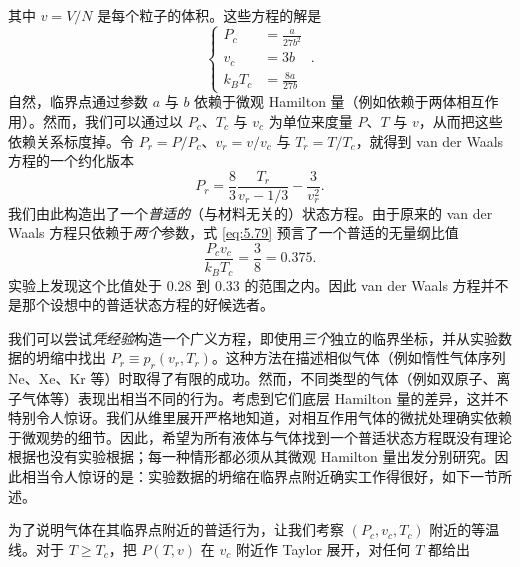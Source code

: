 其中 $v=V/N$ 是每个粒子的体积。这些方程的解是
\begin{equation}\label{eq:5.79}
\left\{
\begin{aligned}
P_c&=\frac{a}{27b^2}\\
v_c&=3b\\
k_BT_c&=\frac{8a}{27b}
\end{aligned}
\right.\ .
\end{equation}
自然，临界点通过参数 $a$ 与 $b$ 依赖于微观 Hamilton 量（例如依赖于两体相互作用）。然而，我们可以通过以 $P_c$、$T_c$ 与 $v_c$ 为单位来度量 $P$、$T$ 与 $v$，从而把这些依赖关系标度掉。令 $P_r=P/P_c$、$v_r=v/v_c$ 与 $T_r=T/T_c$，就得到 van der Waals 方程的一个约化版本
\begin{equation}\label{eq:5.80}
P_r=\frac{8}{3}\frac{T_r}{v_r-1/3}-\frac{3}{v_r^2}.
\end{equation}
我们由此构造出了一个\emph{普适的}（与材料无关的）状态方程。由于原来的 van der Waals 方程只依赖于\emph{两个}参数，式 \eqref{eq:5.79} 预言了一个普适的无量纲比值
\begin{equation}\label{eq:5.81}
\frac{P_cv_c}{k_BT_c}=\frac{3}{8}=0.375.
\end{equation}
实验上发现这个比值处于 0.28 到 0.33 的范围之内。因此 van der Waals 方程并不是那个设想中的普适状态方程的好候选者。

我们可以尝试\emph{凭经验}构造一个广义方程，即使用\emph{三个}独立的临界坐标，并从实验数据的坍缩中找出 $P_r\equiv p_r(v_r,T_r)$。这种方法在描述相似气体（例如惰性气体序列 Ne、Xe、Kr 等）时取得了有限的成功。然而，不同类型的气体（例如双原子、离子气体等）表现出相当不同的行为。考虑到它们底层 Hamilton 量的差异，这并不特别令人惊讶。我们从维里展开严格地知道，对相互作用气体的微扰处理确实依赖于微观势的细节。因此，希望为所有液体与气体找到一个普适状态方程既没有理论根据也没有实验根据；每一种情形都必须从其微观 Hamilton 量出发分别研究。因此相当令人惊讶的是：实验数据的坍缩在临界点附近确实工作得很好，如下一节所述。


为了说明气体在其临界点附近的普适行为，让我们考察 $(P_c,v_c,T_c)$ 附近的等温线。对于 $T\ge T_c$，把 $P(T,v)$ 在 $v_c$ 附近作 Taylor 展开，对任何 $T$ 都给出


